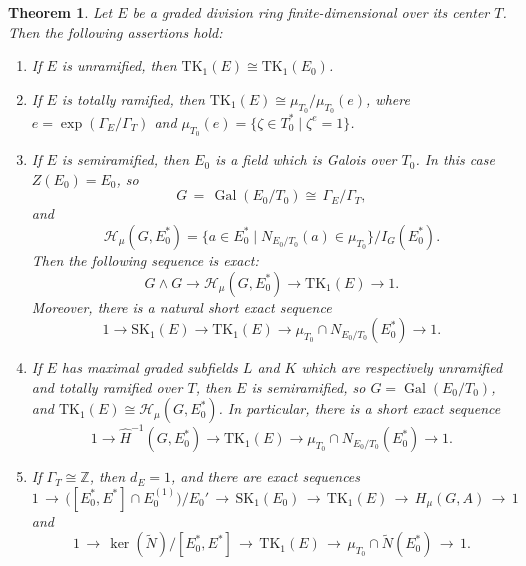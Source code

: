 \documentclass[11pt]{article}
\numberwithin{equation}{section}
\theoremstyle{plain}
\newtheorem{theorem}{Theorem}[section]
\theoremstyle{remark}
\newcommand{\opn}{\operatorname}
\newcommand{\SK}{\opn{SK_1}}
\newcommand{\TK}{\opn{TK_1}}
\newcommand{\zz}{\mathbb Z}
\newcommand{\wt}{\widetilde}
\begin{document}
\begin{theorem}
\label{theorem:graded-tk1-cases}
Let $E$ be a graded division ring finite-dimensional over its center $T$. Then the following assertions hold:
\begin{enumerate}[font=\normalfont]
\item[(i)] If $E$ is unramified, then $\mathrm{TK}_1(E)\cong\mathrm{TK}_1(E_0)$.

\item[(ii)] If $E$ is totally ramified, then $\mathrm{TK}_1(E)\cong \mu_{T_0}/\mu_{T_0}(e)$, where 
$e=\exp(\Gamma_E/\Gamma_T)$ and $\mu_{T_0}(e)=\{\zeta\in T_0^*\mid \zeta^e=1\}$.

\item[(iii)] If $E$ is semiramified, then $E_0$ is a field which is Galois over $T_0$. In this case $Z(E_0)=E_0$, so
$$
        G\,=\,\operatorname{Gal}(E_0/T_0)\cong\,\Gamma_E/\Gamma_T,
$$
and
$$
        \mathcal H_\mu(G,E_0^*)
        =
        \{a\in E_0^*\mid N_{E_0/T_0}(a)\in\mu_{T_0}\}/I_{G}(E_0^*).
$$
Then the following sequence is exact:
$$
        G\wedge G
        \longrightarrow
        \mathcal H_\mu(G,E_0^*)
        \longrightarrow
        \mathrm{TK}_1(E)
        \longrightarrow 1.
$$
Moreover, there is a natural short exact sequence
\begin{equation}
\label{SESsemiram}
        1\longrightarrow
        \mathrm{SK}_1(E)
        \longrightarrow
        \mathrm{TK}_1(E)
        \longrightarrow
        \mu_{T_0}\cap N_{E_0/T_0}(E_0^*)
        \longrightarrow 1.
\end{equation}

\item[(iv)] If $E$ has maximal graded subfields $L$ and $K$ which are respectively unramified and totally ramified 
over $T$, then $E$ is semiramified, so $G=\operatorname{Gal}(E_0/T_0)$, and 
$\mathrm{TK}_1(E)\cong \mathcal H_\mu(G,E_0^*)$. In particular, there is a short exact sequence
\begin{equation}
\label{SESH^-1forTK_1}
        1\longrightarrow
        \widehat H^{-1}(G,E_0^*)
        \longrightarrow
        \mathrm{TK}_1(E)
        \longrightarrow
        \mu_{T_0}\cap N_{E_0/T_0}(E_0^*)
        \longrightarrow 1.
\end{equation}
\item[(v)]  If $\Gamma_T \cong \zz$, then $d_E =1$, and  there are exact sequences 
\begin{equation}
\label{ES:TK_1(E)Gamma_cyclic}
 1 \, \longrightarrow \, \big([E_0^*, E^*]\cap E_0^{(1)}\big)\big/E_0' \, \longrightarrow \,\SK(E_0) \, 
 \longrightarrow \, \TK(E) \, \longrightarrow \, H_{\mu}(G,A) \, \longrightarrow \,1
\end{equation} 
and
\begin{equation}
\label{SES:TK_1(E)Gamma_cyclic}
1 \, \longrightarrow \,  \ker(\wt N)/ [E_0^*, E^*] \, \longrightarrow \,  \TK(E)\, \longrightarrow \, 
 \mu_{T_0} \cap \widetilde{N}(E_0^*) \, \longrightarrow \,  1.  
\end{equation}
\end{enumerate}

\end{theorem}
\end{document}
